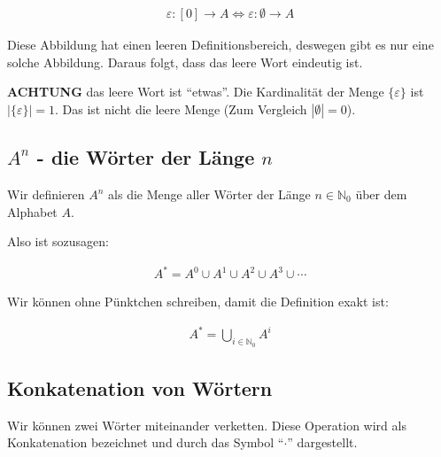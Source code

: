 \documentclass[12pt,a4paper,oneside]{article}
\newcommand{\afz}[1]{\enquote{#1}}
\newcommand{\emptyline}{\hspace*{\fill}}
\newcommand{\N}{\mathbb{N}}
\begin{document}
            \vspace{-1em}
            \begin{align*}
                \varepsilon: [0] \to A \Longleftrightarrow \varepsilon: \emptyset \to A
            \end{align*}

            Diese Abbildung hat einen leeren Definitionsbereich, deswegen gibt es nur eine solche Abbildung.
            Daraus folgt, dass das leere Wort eindeutig ist.

            \emptyline

            \textbf{ACHTUNG} das leere Wort ist \afz{etwas}.
            Die Kardinalität der Menge $\{\varepsilon\}$ ist $|\{\varepsilon\}| = 1$.
            Das ist nicht die leere Menge (Zum Vergleich $|\emptyset| = 0$).

        \subsection{\texorpdfstring{$A^n$ - die Wörter der Länge $n$}{Aⁿ - die Wörter der Länge n}}

            Wir definieren $A^n$ als die Menge aller Wörter der Länge $n \in \N_0$ über dem Alphabet $A$.

            \emptyline

            Also ist sozusagen:

            \vspace{-1em}
            \begin{align*}
                A^* = A^0 \cup A^1 \cup A^2 \cup A^3 \cup \cdots
            \end{align*}

            Wir können ohne Pünktchen schreiben, damit die Definition exakt ist:

            \vspace{-1em}
            \begin{align*}
                A^* = \bigcup_{i \in \N_0} A^i
            \end{align*}

        \subsection{Konkatenation von Wörtern}

            Wir können zwei Wörter miteinander verketten.
            Diese Operation wird als Konkatenation bezeichnet und durch das Symbol \afz{$\cdot$} dargestellt.
\end{document}

